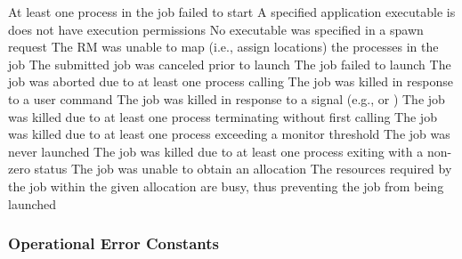 \begin{constantdesc}
%
At least one process in the job failed to start
%
A specified application executable is does not have execution permissions
%
No executable was specified in a spawn request
%
The \ac{RM} was unable to map (i.e., assign locations) the processes in the job
%
The submitted job was canceled prior to launch
%
The job failed to launch
%
The job was aborted due to at least one process calling 
%
The job was killed in response to a user command
%
The job was killed in response to a signal (e.g.,  or )
%
The job was killed due to at least one process terminating without first calling 
%
The job was killed due to at least one process exceeding a monitor threshold
%
The job was never launched
%
The job was killed due to at least one process exiting with a non-zero status
%
The job was unable to obtain an allocation
%
The resources required by the job within the given allocation are busy, thus preventing the job from being launched
%
\end{constantdesc}


\subsubsection{Operational Error Constants}
\label{api:struct:operrors}

